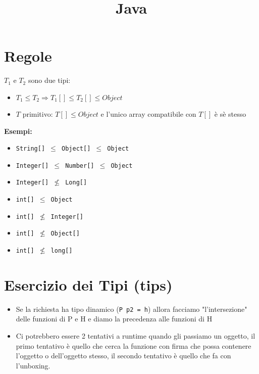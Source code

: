\documentclass[10pt]{article}
\title{Java}
\author{}
\date{}
\begin{document}
\maketitle
{}
\section{Regole}
$T_{1} \text{ e } T_{2}$ sono due tipi:
\begin{itemize}
    \item $T_{1}\leq T_{2}\Rightarrow T_{1}[]\leq T_{2}[] \leq Object$
    \item $T$ primitivo: $T[]\leq Object$ e l'unico array compatibile con $T[]$ è sè stesso
\end{itemize}
\textbf{Esempi:}
\begin{itemize}
    \item \texttt{String[] $\leq$ Object[] $\leq$ Object}
    \item \texttt{Integer[] $\leq$ Number[] $\leq$ Object}
    \item \texttt{Integer[] $\nleq$ Long[]}
    \item \texttt{int[] $\leq$ Object}
    \item \texttt{int[] $\nleq$ Integer[]}
    \item \texttt{int[] $\nleq$ Object[]}
    \item \texttt{int[] $\nleq$ long[]}
\end{itemize}
\section{Esercizio dei Tipi (tips)}
\begin{itemize}
    \item Se la richiesta ha tipo dinamico (\texttt{P p2 = h}) allora facciamo "l'intersezione" delle funzioni di P e H e diamo la precedenza alle funzioni di H
    \item Ci potrebbero essere 2 tentativi a runtime quando gli passiamo un oggetto, il primo tentativo è quello che cerca la funzione con firma che possa contenere l'oggetto o dell'oggetto stesso, il secondo tentativo è quello che fa con l'unboxing.
\end{itemize}
\end{document}
